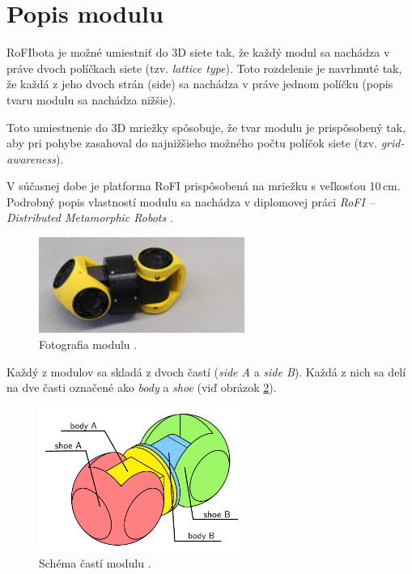 \documentclass[
  digital, %
  oneside, %
  table,   %
  lof,     %
  nolot,     %
]{fithesis3}
\begin{document}
\section{Popis modulu}
\label{sec:moduleSpec}
RoFIbota je možné umiestniť do 3D siete tak, že každý modul sa nachádza v práve dvoch políčkach siete (tzv. \textit{lattice type}). Toto rozdelenie je navrhnuté tak, že každá z jeho dvoch strán (side) sa nachádza v práve jednom políčku (popis tvaru modulu sa nachádza nižšie). 

Toto umiestnenie do 3D mriežky spôsobuje, že tvar modulu je prispôsobený tak, aby pri pohybe zasahoval do najnižšieho možného počtu políčok siete (tzv. \textit{grid-awareness}\cite{mrazekMasterThesis}). 

V súčasnej dobe je platforma RoFI prispôsobená na mriežku s veľkosťou 10\,cm. Podrobný popis vlastností modulu sa nachádza v diplomovej práci \textit{RoFI – Distributed Metamorphic Robots} \cite{mrazekMasterThesis}. 

\begin{figure}[hbt!]
    \centering
    \includegraphics[width=0.6\textwidth]{pictures/module.jpg}
    \caption[Fotografia modulu]{Fotografia modulu \cite{rofiWeb}.}
    \label{fig:module}
\end{figure}

Každý z modulov sa skladá z dvoch častí (\textit{side A} a \textit{side B}). Každá z nich sa delí na dve časti označené ako \textit{body} a \textit{shoe} (viď obrázok \ref{fig:module_parts}). 

\begin{figure}[hbt!]
    \centering
    \includegraphics[width=0.6\textwidth]{pictures/module_parts.pdf}
    \caption[Časti modulu]{Schéma častí modulu \cite{mrazekMasterThesis}.}
    \label{fig:module_parts}
\end{figure}
\end{document}
